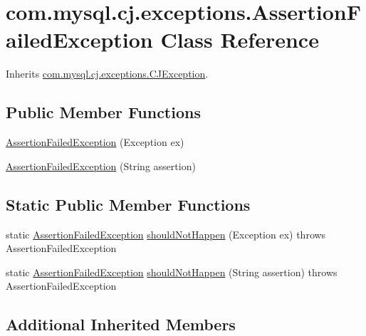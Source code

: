 \hypertarget{classcom_1_1mysql_1_1cj_1_1exceptions_1_1_assertion_failed_exception}{}\section{com.\+mysql.\+cj.\+exceptions.\+Assertion\+Failed\+Exception Class Reference}
\label{classcom_1_1mysql_1_1cj_1_1exceptions_1_1_assertion_failed_exception}


Inherits \mbox{\hyperlink{classcom_1_1mysql_1_1cj_1_1exceptions_1_1_c_j_exception}{com.\+mysql.\+cj.\+exceptions.\+C\+J\+Exception}}.

\subsection*{Public Member Functions}
\begin{DoxyCompactItemize}
\item 
\mbox{\hyperlink{classcom_1_1mysql_1_1cj_1_1exceptions_1_1_assertion_failed_exception_a5415e5a70771aecd36332eea0f66cc88}{Assertion\+Failed\+Exception}} (Exception ex)
\item 
\mbox{\hyperlink{classcom_1_1mysql_1_1cj_1_1exceptions_1_1_assertion_failed_exception_abaf0e83479af12138fb3c3218cae7609}{Assertion\+Failed\+Exception}} (String assertion)
\end{DoxyCompactItemize}
\subsection*{Static Public Member Functions}
\begin{DoxyCompactItemize}
\item 
static \mbox{\hyperlink{classcom_1_1mysql_1_1cj_1_1exceptions_1_1_assertion_failed_exception}{Assertion\+Failed\+Exception}} \mbox{\hyperlink{classcom_1_1mysql_1_1cj_1_1exceptions_1_1_assertion_failed_exception_a357eac18cfa5a41a6fd49b3ee7af086c}{should\+Not\+Happen}} (Exception ex)  throws Assertion\+Failed\+Exception 
\item 
static \mbox{\hyperlink{classcom_1_1mysql_1_1cj_1_1exceptions_1_1_assertion_failed_exception}{Assertion\+Failed\+Exception}} \mbox{\hyperlink{classcom_1_1mysql_1_1cj_1_1exceptions_1_1_assertion_failed_exception_ab381eb045e20071a7ffed06a7d602f33}{should\+Not\+Happen}} (String assertion)  throws Assertion\+Failed\+Exception 
\end{DoxyCompactItemize}
\subsection*{Additional Inherited Members}


